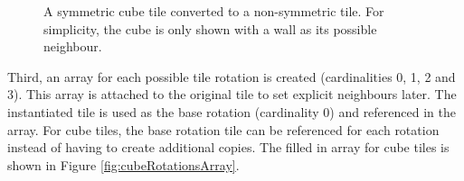 \begin{figure}[H]
{\begin{minipage}[b]{0.45\linewidth}
        \end{minipage}
        \label{fig:cubeSymmetryConversion2}
    }
    \caption{A symmetric cube tile converted to a non-symmetric tile. For simplicity, the cube is only shown with a wall as its possible neighbour.}
    \label{fig:cubeSymmetryConversion}
\end{figure}

Third, an array for each possible tile rotation is created (cardinalities 0, 1, 2 and 3). This array is attached to the original tile to set explicit neighbours later. The instantiated tile is used as the base rotation (cardinality 0) and referenced in the array. For cube tiles, the base rotation tile can be referenced for each rotation instead of having to create additional copies. The filled in array for cube tiles is shown in Figure \ref{fig:cubeRotationsArray}.

